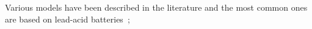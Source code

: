 \documentclass[journal]{IEEEtran}
\begin{document}
Various models have been described in the literature and the most common ones are based on lead-acid batteries~\cite{Copetti,Manwell93,Pinho};
%
%
%
%
%
\end{document}
